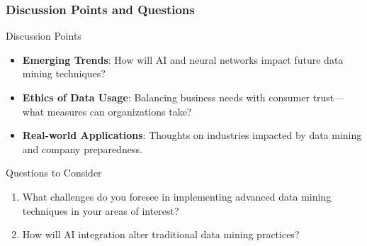 \documentclass{beamer}
\begin{document}
\begin{frame}[fragile]
    \frametitle{Discussion Points and Questions}
    \begin{block}{Discussion Points}
        \begin{itemize}
            \item \textbf{Emerging Trends}: How will AI and neural networks impact future data mining techniques? 
            \item \textbf{Ethics of Data Usage}: Balancing business needs with consumer trust—what measures can organizations take?
            \item \textbf{Real-world Applications}: Thoughts on industries impacted by data mining and company preparedness.
        \end{itemize}
    \end{block}

    \begin{block}{Questions to Consider}
        \begin{enumerate}
            \item What challenges do you foresee in implementing advanced data mining techniques in your areas of interest?
            \item How will AI integration alter traditional data mining practices?
        \end{enumerate}
    \end{block}
\end{frame}
\end{document}
